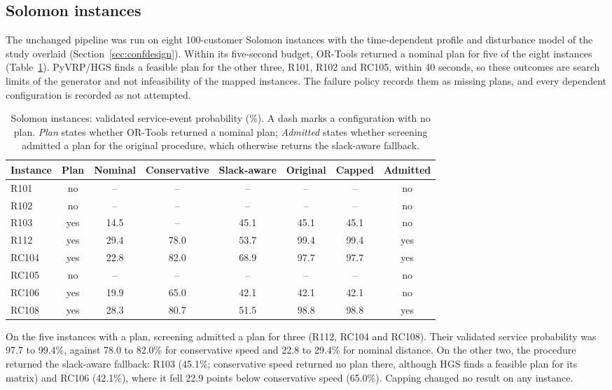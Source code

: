 \subsection{Solomon instances}\label{sec:solomon}

The unchanged pipeline was run on eight 100-customer Solomon instances with the time-dependent profile and disturbance model of the study overlaid (Section~\ref{sec:confdesign}). Within its five-second budget, OR-Tools returned a nominal plan for five of the eight instances (Table~\ref{tab:solomon}). PyVRP/HGS finds a feasible plan for the other three, R101, R102 and RC105, within 40 seconds, so these outcomes are search limits of the generator and not infeasibility of the mapped instances. The failure policy records them as missing plans, and every dependent configuration is recorded as not attempted.

\begin{table}[htbp]
\centering
\small
\caption{Solomon instances: validated service-event probability (\%). A dash marks a configuration with no plan. \emph{Plan} states whether OR-Tools returned a nominal plan; \emph{Admitted} states whether screening admitted a plan for the original procedure, which otherwise returns the slack-aware fallback.}
\label{tab:solomon}
\begin{tabular}{@{}lccccccc@{}}
\toprule
Instance & Plan & Nominal & Conservative & Slack-aware & Original & Capped & Admitted\\
\midrule
R101 & no & -- & -- & -- & -- & -- & no\\
R102 & no & -- & -- & -- & -- & -- & no\\
R103 & yes & 14.5 & -- & 45.1 & 45.1 & 45.1 & no\\
R112 & yes & 29.4 & 78.0 & 53.7 & 99.4 & 99.4 & yes\\
RC104 & yes & 22.8 & 82.0 & 68.9 & 97.7 & 97.7 & yes\\
RC105 & no & -- & -- & -- & -- & -- & no\\
RC106 & yes & 19.9 & 65.0 & 42.1 & 42.1 & 42.1 & no\\
RC108 & yes & 28.3 & 80.7 & 51.5 & 98.8 & 98.8 & yes\\
\bottomrule
\end{tabular}
\end{table}

On the five instances with a plan, screening admitted a plan for three (R112, RC104 and RC108). Their validated service probability was 97.7 to 99.4\%, against 78.0 to 82.0\% for conservative speed and 22.8 to 29.4\% for nominal distance. On the other two, the procedure returned the slack-aware fallback: R103 (45.1\%; conservative speed returned no plan there, although HGS finds a feasible plan for its matrix) and RC106 (42.1\%), where it fell 22.9 points below conservative speed (65.0\%). Capping changed no result on any instance.

